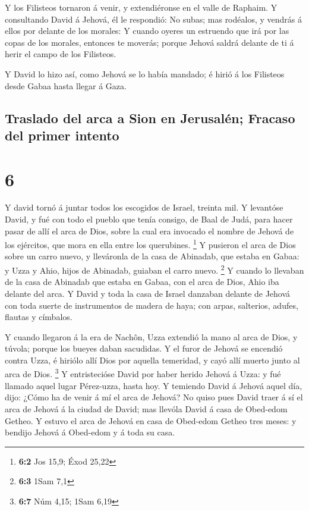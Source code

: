  Y los Filisteos tornaron á venir, y extendiéronse en el
valle de Raphaim.  Y consultando David á Jehová, él le
respondió: No subas; mas rodéalos, y vendrás á ellos por delante de los
morales:  Y cuando oyeres un estruendo que irá por las
copas de los morales, entonces te moverás; porque Jehová saldrá delante
de ti á herir el campo de los Filisteos.

 Y David lo hizo así, como Jehová se lo había mandado; é
hirió á los Filisteos desde Gabaa hasta llegar á Gaza.

\hypertarget{traslado-del-arca-a-sion-en-jerusaluxe9n-fracaso-del-primer-intento}{%
\subsection{Traslado del arca a Sion en Jerusalén; Fracaso del primer
intento}\label{traslado-del-arca-a-sion-en-jerusaluxe9n-fracaso-del-primer-intento}}

\hypertarget{section-5}{%
\section{6}\label{section-5}}

 Y david tornó á juntar todos los escogidos de Israel,
treinta mil.  Y levantóse David, y fué con todo el pueblo
que tenía consigo, de Baal de Judá, para hacer pasar de allí el arca de
Dios, sobre la cual era invocado el nombre de Jehová de los ejércitos,
que mora en ella entre los querubines. \footnote{\textbf{6:2} Jos 15,9;
  Éxod 25,22}  Y pusieron el arca de Dios sobre un carro
nuevo, y lleváronla de la casa de Abinadab, que estaba en Gabaa: y Uzza
y Ahio, hijos de Abinadab, guiaban el carro nuevo. \footnote{\textbf{6:3}
  1Sam 7,1}  Y cuando lo llevaban de la casa de Abinadab que
estaba en Gabaa, con el arca de Dios, Ahio iba delante del arca.
 Y David y toda la casa de Israel danzaban delante de Jehová
con toda suerte de instrumentos de madera de haya; con arpas, salterios,
adufes, flautas y címbalos.

 Y cuando llegaron á la era de Nachôn, Uzza extendió la mano
al arca de Dios, y túvola; porque los bueyes daban sacudidas.
 Y el furor de Jehová se encendió contra Uzza, é hiriólo
allí Dios por aquella temeridad, y cayó allí muerto junto al arca de
Dios. \footnote{\textbf{6:7} Núm 4,15; 1Sam 6,19}  Y
entristecióse David por haber herido Jehová á Uzza: y fué llamado aquel
lugar Pérez-uzza, hasta hoy.  Y temiendo David á Jehová
aquel día, dijo: ¿Cómo ha de venir á mí el arca de Jehová? 
No quiso pues David traer á sí el arca de Jehová á la ciudad de David;
mas llevóla David á casa de Obed-edom Getheo.  Y estuvo el
arca de Jehová en casa de Obed-edom Getheo tres meses: y bendijo Jehová
á Obed-edom y á toda su casa.

